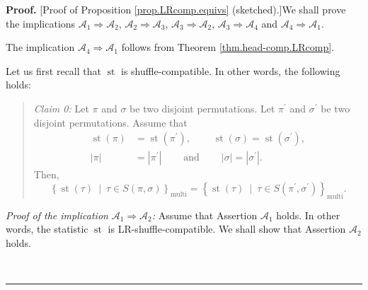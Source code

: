 \documentclass[numbers=enddot,12pt,final,onecolumn,notitlepage]{scrartcl}%
\theoremstyle{definition}
\newenvironment{statement}{\begin{quote}}{\end{quote}}
\newenvironment{proof}[1][Proof]{\noindent\textbf{#1.} }{\ \rule{0.5em}{0.5em}}
\newenvironment{verlong}{}{}
\newenvironment{noncompile}{}{}
\begin{document}
\begin{verlong}
\begin{proof}
[Proof of Proposition \ref{prop.LRcomp.equivs} (sketched).]We shall prove the
implications $\mathcal{A}_{1}\Longrightarrow\mathcal{A}_{2}$, $\mathcal{A}%
_{2}\Longrightarrow\mathcal{A}_{3}$, $\mathcal{A}_{3}\Longrightarrow
\mathcal{A}_{2}$, $\mathcal{A}_{3}\Longrightarrow\mathcal{A}_{4}$ and
$\mathcal{A}_{4}\Longrightarrow\mathcal{A}_{1}$.

The implication $\mathcal{A}_{4}\Longrightarrow\mathcal{A}_{1}$ follows from
Theorem \ref{thm.head-comp.LRcomp}.

\begin{noncompile}
Let us first recall that $\operatorname*{st}$ is shuffle-compatible. In other
words, the following holds:

\begin{statement}
\textit{Claim 0:} Let $\pi$ and $\sigma$ be two disjoint permutations. Let
$\pi^{\prime}$ and $\sigma^{\prime}$ be two disjoint permutations. Assume that%
\begin{align*}
\operatorname*{st}\left(  \pi\right)   &  =\operatorname*{st}\left(
\pi^{\prime}\right)  ,\ \ \ \ \ \ \ \ \ \ \operatorname*{st}\left(
\sigma\right)  =\operatorname*{st}\left(  \sigma^{\prime}\right)  ,\\
\left\vert \pi\right\vert  &  =\left\vert \pi^{\prime}\right\vert
\ \ \ \ \ \ \ \ \ \ \text{and}\ \ \ \ \ \ \ \ \ \ \left\vert \sigma\right\vert
=\left\vert \sigma^{\prime}\right\vert .
\end{align*}
Then,
\[
\left\{  \operatorname*{st}\left(  \tau\right)  \ \mid\ \tau\in S\left(
\pi,\sigma\right)  \right\}  _{\operatorname*{multi}}=\left\{
\operatorname*{st}\left(  \tau\right)  \ \mid\ \tau\in S\left(  \pi^{\prime
},\sigma^{\prime}\right)  \right\}  _{\operatorname*{multi}}.
\]

\end{statement}
\end{noncompile}

\textit{Proof of the implication }$\mathcal{A}_{1}\Longrightarrow
\mathcal{A}_{2}$\textit{:} Assume that Assertion $\mathcal{A}_{1}$ holds. In
other words, the statistic $\operatorname*{st}$ is LR-shuffle-compatible. We
shall show that Assertion $\mathcal{A}_{2}$ holds.


\end{proof}
\end{verlong}
\end{document}
